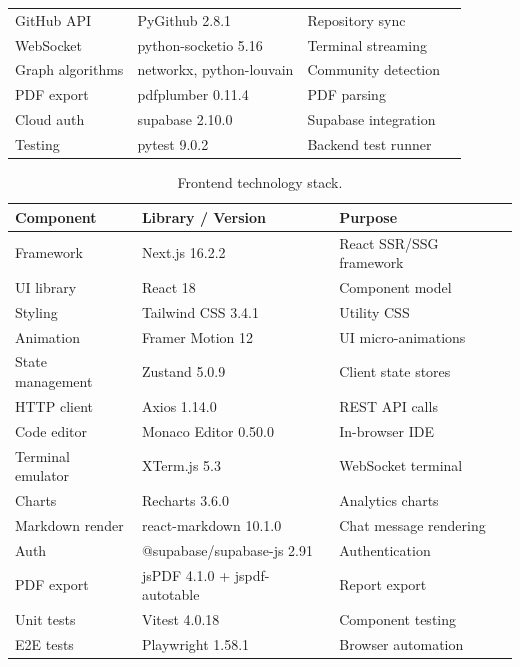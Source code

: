 \begin{table}[ht]
\begin{tabular}{llll}
        GitHub API          & PyGithub 2.8.1        & Repository sync \\
        WebSocket           & python-socketio 5.16  & Terminal streaming \\
        Graph algorithms    & networkx, python-louvain & Community detection \\
        PDF export          & pdfplumber 0.11.4     & PDF parsing \\
        Cloud auth          & supabase 2.10.0       & Supabase integration \\
        Testing             & pytest 9.0.2          & Backend test runner \\
        \bottomrule
    \end{tabular}
\end{table}

\begin{table}[ht]
    \centering
    \caption{Frontend technology stack.}
    \label{tab:frontend-stack}
    \begin{tabular}{lll}
        \toprule
        \textbf{Component} & \textbf{Library / Version} & \textbf{Purpose} \\
        \midrule
        Framework           & Next.js 16.2.2        & React SSR/SSG framework \\
        UI library          & React 18              & Component model \\
        Styling             & Tailwind CSS 3.4.1    & Utility CSS \\
        Animation           & Framer Motion 12      & UI micro-animations \\
        State management    & Zustand 5.0.9         & Client state stores \\
        HTTP client         & Axios 1.14.0          & REST API calls \\
        Code editor         & Monaco Editor 0.50.0  & In-browser IDE \\
        Terminal emulator   & XTerm.js 5.3          & WebSocket terminal \\
        Charts              & Recharts 3.6.0        & Analytics charts \\
        Markdown render     & react-markdown 10.1.0 & Chat message rendering \\
        Auth                & @supabase/supabase-js 2.91 & Authentication \\
        PDF export          & jsPDF 4.1.0 + jspdf-autotable & Report export \\
        Unit tests          & Vitest 4.0.18         & Component testing \\
        E2E tests           & Playwright 1.58.1     & Browser automation \\
        \bottomrule
    \end{tabular}
\end{table}

